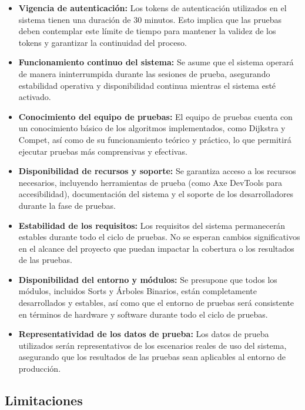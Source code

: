 \documentclass[stu, 12pt, letterpaper, donotrepeattitle, floatsintext, natbib]{apa7}
\begin{document}
\begin{itemize}
    \item \textbf{Vigencia de autenticación:} Los tokens de autenticación utilizados en el sistema tienen una duración de 30 minutos. Esto implica que las pruebas deben contemplar este límite de tiempo para mantener la validez de los tokens y garantizar la continuidad del proceso.

    \item \textbf{Funcionamiento continuo del sistema:} Se asume que el sistema operará de manera ininterrumpida durante las sesiones de prueba, asegurando estabilidad operativa y disponibilidad continua mientras el sistema esté activado.

    \item \textbf{Conocimiento del equipo de pruebas:} El equipo de pruebas cuenta con un conocimiento básico de los algoritmos implementados, como Dijkstra y Compet, así como de su funcionamiento teórico y práctico, lo que permitirá ejecutar pruebas más comprensivas y efectivas.

    \item \textbf{Disponibilidad de recursos y soporte:} Se garantiza acceso a los recursos necesarios, incluyendo herramientas de prueba (como Axe DevTools para accesibilidad), documentación del sistema y el soporte de los desarrolladores durante la fase de pruebas.

    \item \textbf{Estabilidad de los requisitos:} Los requisitos del sistema permanecerán estables durante todo el ciclo de pruebas. No se esperan cambios significativos en el alcance del proyecto que puedan impactar la cobertura o los resultados de las pruebas.

    \item \textbf{Disponibilidad del entorno y módulos:} Se presupone que todos los módulos, incluidos Sorts y Árboles Binarios, están completamente desarrollados y estables, así como que el entorno de pruebas será consistente en términos de hardware y software durante todo el ciclo de pruebas.

    \item \textbf{Representatividad de los datos de prueba:} Los datos de prueba utilizados serán representativos de los escenarios reales de uso del sistema, asegurando que los resultados de las pruebas sean aplicables al entorno de producción.
\end{itemize}

\subsection{Limitaciones}
\end{document}
